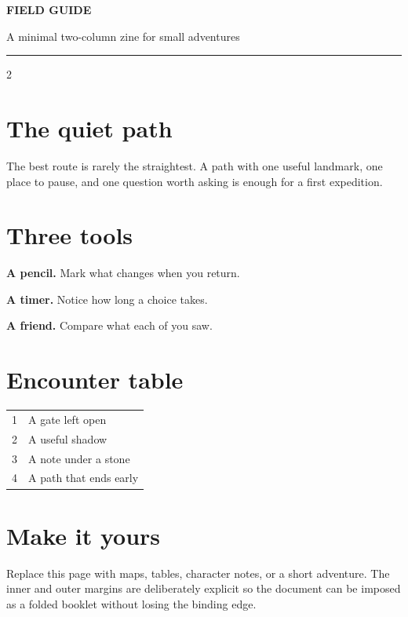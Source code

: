 \documentclass[10pt,twoside]{article}
\begin{document}
\begin{center}
  {\sffamily\fontsize{30}{32}\selectfont\bfseries FIELD GUIDE}\par
  {\sffamily\large\color{zineorange}A minimal two-column zine for small adventures}\par
  \smallskip\rule{0.9\linewidth}{1pt}
\end{center}
\begin{multicols}{2}
\section*{The quiet path}
The best route is rarely the straightest. A path with one useful landmark,
one place to pause, and one question worth asking is enough for a first
expedition.

\section*{Three tools}
\textbf{A pencil.} Mark what changes when you return.\par
\textbf{A timer.} Notice how long a choice takes.\par
\textbf{A friend.} Compare what each of you saw.

\section*{Encounter table}
\begin{tabular}{p{}p{}}
1 & A gate left open\\
2 & A useful shadow\\
3 & A note under a stone\\
4 & A path that ends early
\end{tabular}

\section*{Make it yours}
Replace this page with maps, tables, character notes, or a short adventure.
The inner and outer margins are deliberately explicit so the document can be
imposed as a folded booklet without losing the binding edge.
\end{multicols}
\end{document}
